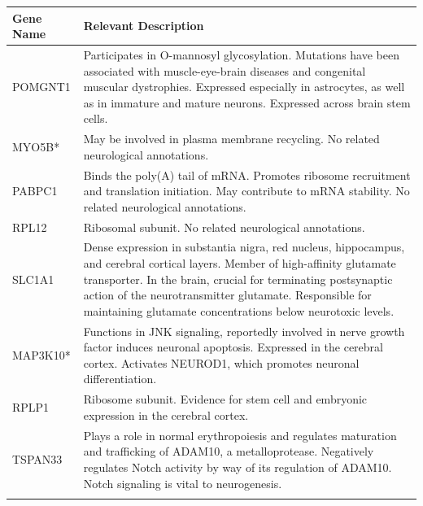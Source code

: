 \documentclass[10pt, oneside]{article}
\begin{document}
\begin{table}[!]
    \centering
{}
\begin{tabular}{p{2.5cm}p{15.5cm}}
 \textbf{Gene Name} & \textbf{Relevant Description} \\
 \hline
 POMGNT1 & Participates in O-mannosyl glycosylation. Mutations have been associated with muscle-eye-brain diseases and congenital muscular dystrophies. Expressed especially in astrocytes, as well as in immature and mature neurons. Expressed across brain stem cells. \\
 \hline
 MYO5B* & May be involved in plasma membrane recycling. No related neurological annotations. \\
 \hline
 PABPC1 & Binds the poly(A) tail of mRNA. Promotes ribosome recruitment and translation initiation. May contribute to mRNA stability. No related neurological annotations. \\
 \hline
 RPL12 & Ribosomal subunit. No related neurological annotations. \\
 \hline
 SLC1A1 & Dense expression in substantia nigra, red nucleus, hippocampus, and cerebral cortical layers. Member of high-affinity glutamate transporter. In the brain, crucial for terminating postsynaptic action of the neurotransmitter glutamate. Responsible for maintaining glutamate concentrations below neurotoxic levels. \\
 \hline
 MAP3K10* & Functions in JNK signaling, reportedly involved in nerve growth factor induces neuronal apoptosis. Expressed in the cerebral cortex. Activates NEUROD1, which promotes neuronal differentiation. \\
 \hline
 RPLP1 & Ribosome subunit. Evidence for stem cell and embryonic expression in the cerebral cortex. \\
 \hline
 TSPAN33 & Plays a role in normal erythropoiesis and regulates maturation and trafficking of ADAM10, a metalloprotease. Negatively regulates Notch activity by way of its regulation of ADAM10. Notch signaling is vital to neurogenesis. \\
 \label{tab:targets}
\end{tabular}
\end{table}
\end{document}
